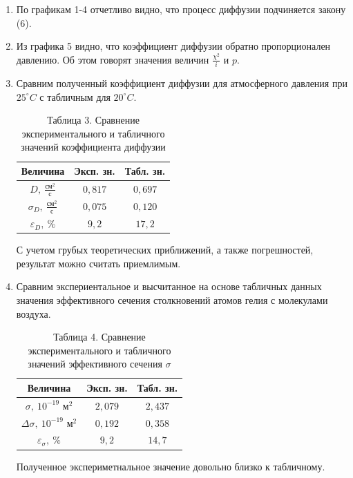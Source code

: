 \documentclass[a4paper]{article}
\begin{document}
\begin{enumerate}
\item По графикам 1-4 отчетливо видно, что процесс диффузии подчиняется закону (6). 
\item Из графика 5 видно, что коэффициент диффузии обратно пропорционален давлению. Об этом говорят значения величин $\frac{\chi^2}{i}$ и $p$.
\item Сравним полученный коэффициент диффузии для атмосферного давления при $25^\circ C$ с табличным для $20^\circ C$.
\begin{table}[h!]
    \centering
    \begin{tabular}{|c|c|c|}
        \hline
        Величина & Эксп. зн. & Табл. зн. \\
        \hline
        $D,\ \frac{\text{см}^2}{\text{с}}$ & $0{,}817$ & $0{,}697$ \\ \hline
        $\sigma_D,\ \frac{\text{см}^2}{\text{с}}$ & $0{,}075$ & $0{,}120$ \\ \hline
        $\varepsilon_D,\ \%$ & $9{,}2$ & $17{,}2$ \\
        \hline
    \end{tabular}
    \caption{Таблица 3. Сравнение экспериментального и табличного значений коэффициента диффузии}
\end{table}
С учетом грубых теоретических приближений, а также погрешностей, результат можно считать приемлимым. 

\item Сравним экспериентальное и высчитанное на основе табличных данных значения эффективного сечения столкновений атомов гелия с молекулами воздуха.
\begin{table}[h!]
    \centering
    \begin{tabular}{|c|c|c|}
        \hline
        Величина & Эксп. зн. & Табл. зн. \\
        \hline
        $\sigma,\ 10^{-19} \text{ м}^2$ & $2{,}079$ & $2{,}437$ \\ \hline
        $\Delta\sigma,\ 10^{-19} \text{ м}^2$ & $0{,}192$ & $0{,}358$ \\ \hline
        $\varepsilon_\sigma,\ \%$ & $9{,}2$ & $14{,}7$ \\
        \hline
    \end{tabular}
    \caption{Таблица 4. Сравнение экспериментального и табличного значений эффективного сечения $\sigma$}
\end{table}

Полученное экспериметнальное значение довольно близко к табличному.
\end{enumerate}
\end{document}
